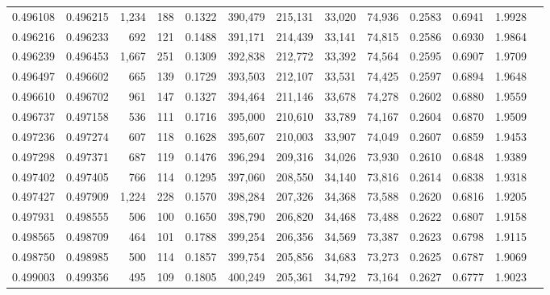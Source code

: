 \begin{tabular}{rrrrrrrrrrrrr}
0.496108 & 0.496215 & 1,234 &   188 &                                     0.1322 & 390,479 & 215,131 &  33,020 &  74,936 & 0.2583 & 0.6941 & 1.9928 \\
0.496216 & 0.496233 &   692 &   121 &                                     0.1488 & 391,171 & 214,439 &  33,141 &  74,815 & 0.2586 & 0.6930 & 1.9864 \\
0.496239 & 0.496453 & 1,667 &   251 &                                     0.1309 & 392,838 & 212,772 &  33,392 &  74,564 & 0.2595 & 0.6907 & 1.9709 \\
0.496497 & 0.496602 &   665 &   139 &                                     0.1729 & 393,503 & 212,107 &  33,531 &  74,425 & 0.2597 & 0.6894 & 1.9648 \\
0.496610 & 0.496702 &   961 &   147 &                                     0.1327 & 394,464 & 211,146 &  33,678 &  74,278 & 0.2602 & 0.6880 & 1.9559 \\
0.496737 & 0.497158 &   536 &   111 &                                     0.1716 & 395,000 & 210,610 &  33,789 &  74,167 & 0.2604 & 0.6870 & 1.9509 \\
0.497236 & 0.497274 &   607 &   118 &                                     0.1628 & 395,607 & 210,003 &  33,907 &  74,049 & 0.2607 & 0.6859 & 1.9453 \\
0.497298 & 0.497371 &   687 &   119 &                                     0.1476 & 396,294 & 209,316 &  34,026 &  73,930 & 0.2610 & 0.6848 & 1.9389 \\
0.497402 & 0.497405 &   766 &   114 &                                     0.1295 & 397,060 & 208,550 &  34,140 &  73,816 & 0.2614 & 0.6838 & 1.9318 \\
0.497427 & 0.497909 & 1,224 &   228 &                                     0.1570 & 398,284 & 207,326 &  34,368 &  73,588 & 0.2620 & 0.6816 & 1.9205 \\
0.497931 & 0.498555 &   506 &   100 &                                     0.1650 & 398,790 & 206,820 &  34,468 &  73,488 & 0.2622 & 0.6807 & 1.9158 \\
0.498565 & 0.498709 &   464 &   101 &                                     0.1788 & 399,254 & 206,356 &  34,569 &  73,387 & 0.2623 & 0.6798 & 1.9115 \\
0.498750 & 0.498985 &   500 &   114 &                                     0.1857 & 399,754 & 205,856 &  34,683 &  73,273 & 0.2625 & 0.6787 & 1.9069 \\
0.499003 & 0.499356 &   495 &   109 &                                     0.1805 & 400,249 & 205,361 &  34,792 &  73,164 & 0.2627 & 0.6777 & 1.9023 \\

\end{tabular}
